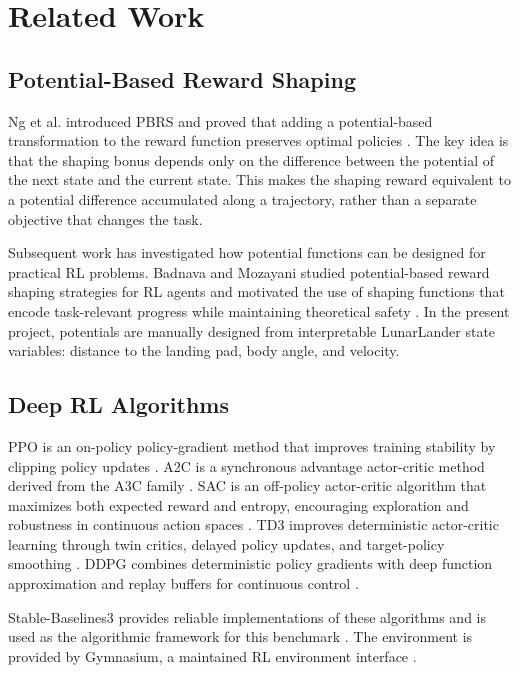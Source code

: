 \documentclass[conference,10pt]{IEEEtran}
\begin{document}
\section{Related Work}
\subsection{Potential-Based Reward Shaping}
Ng et al. introduced PBRS and proved that adding a potential-based transformation to the reward function preserves optimal policies \cite{ng1999policy}. The key idea is that the shaping bonus depends only on the difference between the potential of the next state and the current state. This makes the shaping reward equivalent to a potential difference accumulated along a trajectory, rather than a separate objective that changes the task.

Subsequent work has investigated how potential functions can be designed for practical RL problems. Badnava and Mozayani studied potential-based reward shaping strategies for RL agents and motivated the use of shaping functions that encode task-relevant progress while maintaining theoretical safety \cite{badnava2019pbrs}. In the present project, potentials are manually designed from interpretable LunarLander state variables: distance to the landing pad, body angle, and velocity.

\subsection{Deep RL Algorithms}
PPO is an on-policy policy-gradient method that improves training stability by clipping policy updates \cite{schulman2017ppo}. A2C is a synchronous advantage actor-critic method derived from the A3C family \cite{mnih2016a3c}. SAC is an off-policy actor-critic algorithm that maximizes both expected reward and entropy, encouraging exploration and robustness in continuous action spaces \cite{haarnoja2018sac}. TD3 improves deterministic actor-critic learning through twin critics, delayed policy updates, and target-policy smoothing \cite{fujimoto2018td3}. DDPG combines deterministic policy gradients with deep function approximation and replay buffers for continuous control \cite{lillicrap2015ddpg}.

Stable-Baselines3 provides reliable implementations of these algorithms and is used as the algorithmic framework for this benchmark \cite{raffin2021sb3}. The environment is provided by Gymnasium, a maintained RL environment interface \cite{towers2024gymnasium}.
\end{document}
